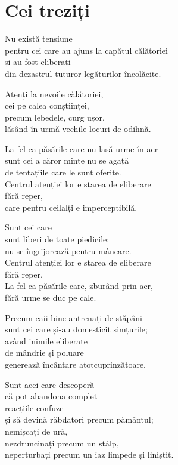 
\chapter{Cei treziți}


Nu există tensiune\\
pentru cei care au ajuns la capătul călătoriei\\
și au fost eliberați\\
din dezastrul tuturor legăturilor încolăcite.


Atenți la nevoile călătoriei,\\
cei pe calea conștiinței,\\
precum lebedele, curg ușor,\\
lăsând în urmă vechile locuri de odihnă.


La fel ca păsările care nu lasă urme în aer\\
sunt cei a căror minte nu se agață\\
de tentațiile care le sunt oferite.\\
Centrul atenției lor e starea de eliberare\\
fără reper,\\
care pentru ceilalți e imperceptibilă.


Sunt cei care\\
sunt liberi de toate piedicile;\\
nu se îngrijorează pentru mâncare.\\
Centrul atenției lor e starea de eliberare\\
fără reper.\\
La fel ca păsările care, zburând prin aer,\\
fără urme se duc pe cale.


Precum caii bine-antrenați de stăpâni\\
sunt cei care și-au domesticit simțurile;\\
având inimile eliberate\\
de mândrie și poluare\\
generează încântare atotcuprinzătoare.


Sunt acei care descoperă\\
că pot abandona complet\\
reacțiile confuze\\
și să devină răbdători precum pământul;\\
nemișcați de ură,\\
nezdruncinați precum un stâlp,\\
neperturbați precum un iaz limpede și liniștit.


